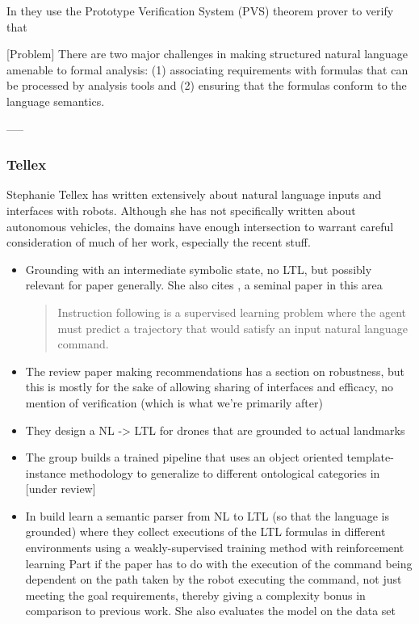 \documentclass[a4paper, 11pt]{article}
\begin{document}
In \cite{fret} they use the Prototype Verification System (PVS) theorem prover
to verify that 

[Problem] There are two major challenges in making structured natural language
amenable to formal analysis: (1) associating requirements with formulas that can
be processed by analysis tools and (2) ensuring that the formulas conform to the
language semantics. \cite{fretish}

----- 



\subsubsection{Tellex}

Stephanie Tellex has written extensively about natural language inputs and
interfaces with robots. Although she has not specifically written about
autonomous vehicles, the domains have enough intersection to warrant careful
consideration of much of her work, especially the recent stuff.

\begin{itemize}

\item Grounding with an intermediate symbolic state, no LTL, but possibly
  relevant for paper generally. She also cites \cite{walkTalk}, a seminal paper in this area
\begin{quote}
Instruction following is a supervised learning problem
where the agent must predict a trajectory that would satisfy an
input natural language command. \cite{tellexInstr}
\end{quote}
\item The review paper \cite{MARGE2022101255} making recommendations has a
  section on robustness, but this is mostly for the sake of allowing sharing of
  interfaces and efficacy, no mention of verification (which is what we're
  primarily after)
\item They design a NL -> LTL for drones that are grounded to actual landmarks \cite{9197068}
\item The group builds a trained pipeline that uses an object oriented
  template-instance methodology to generalize to different ontological
  categories in  \cite{hsiung2021generalizing} [under review]

\item In \cite{patellearning} build learn a semantic parser from NL to LTL (so
that the language is grounded) where they collect executions of the LTL formulas
in different environments using a weakly-supervised training method with
reinforcement learning Part if the paper has to do with the execution of the
command being dependent on the path taken by the robot executing the command,
not just meeting the goal requirements, thereby giving a complexity bonus in
comparison to previous work. She also evaluates the model on the \cite{walkTalk}
data set
\end{itemize}
\end{document}
